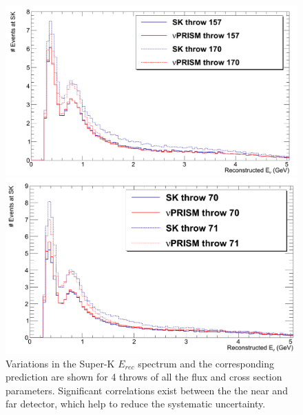\begin{figure}[htpb]
\begin{center}
  \begin{minipage}[t]{.45\textwidth}
    \begin{center}
      \includegraphics[width=\textwidth] {figures/nuPRISM_SK_Throws_1.png}
    \end{center}
  \end{minipage}
  \begin{minipage}[t]{.45\textwidth}
    \begin{center}
      \includegraphics[width=\textwidth] {figures/nuPRISM_SK_Throws_2.png}
    \end{center}
  \end{minipage}
\end{center}
\caption{Variations in the Super-K $E_{rec}$ spectrum and the corresponding \nuprismlite prediction are shown for 4 throws of all the flux and cross section parameters. Significant correlations exist between the the near and far detector, which help to reduce the systematic uncertainty.}
\label{fig:erecerrors}
\end{figure}

